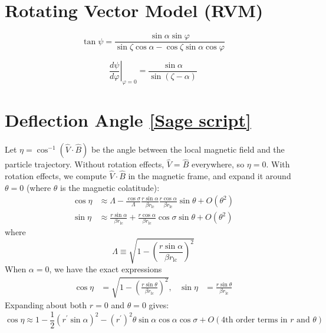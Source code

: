 \documentclass{book}
\newcommand{\phase}{\varphi}
\newcommand{\rL}{r_\text{lc}} %
\newcommand{\linktosage}[1]{\hyperref[#1]{[Sage script]}}
\begin{document}
\section{Rotating Vector Model (RVM)}

\begin{equation}
    \tan{\psi} = \frac{\sin\alpha \sin\phase}{\sin\zeta\cos\alpha - \cos\zeta\sin\alpha\cos\phase}
\end{equation}

\begin{equation}
    \left.\frac{d\psi}{d\phase}\right|_{\phase=0} = \frac{\sin\alpha}{\sin(\zeta-\alpha)}
\end{equation}

\section{Deflection Angle \linktosage{sage:aberration_dip}}

Let $\eta = \cos^{-1}(\hat{V}\cdot\hat{B})$ be the angle between the local magnetic field and the particle trajectory.
Without rotation effects, $\hat{V} = \hat{B}$ everywhere, so $\eta = 0$.
With rotation effects, we compute $\hat{V}\cdot\hat{B}$ in the magnetic frame, and expand it around $\theta = 0$ (where $\theta$ is the magnetic colatitude):
\begin{equation}
    \begin{aligned}
        \cos\eta &\approx \Lambda - \frac{\cos\sigma}{\Lambda} \frac{r\sin\alpha}{\beta \rL} \frac{r\cos\alpha}{\beta \rL} \sin\theta +
                          O(\theta^2) \\
        \sin\eta &\approx \frac{r\sin\alpha}{\beta \rL} + \frac{r\cos\alpha}{\beta \rL}\cos\sigma\sin\theta +
                          O(\theta^2)
    \end{aligned}
\end{equation}
where
\begin{equation}
    \Lambda \equiv \sqrt{1-\left(\frac{r\sin\alpha}{\beta \rL}\right)^2}
\end{equation}
When $\alpha = 0$, we have the exact expressions
\begin{align}
    \cos\eta &= \sqrt{1-\left(\frac{r\sin\theta}{\beta \rL}\right)^2}, &
    \sin\eta &= \frac{r\sin\theta}{\beta \rL}
\end{align}
Expanding about both $r = 0$ and $\theta = 0$ gives:
\begin{equation}
    \cos\eta \approx 1 - \frac12(r^\prime\sin\alpha)^2 - (r^\prime)^2\theta\sin\alpha\cos\alpha\cos\sigma + O(\text{4th order terms in $r$ and $\theta$})
\end{equation}
\end{document}
